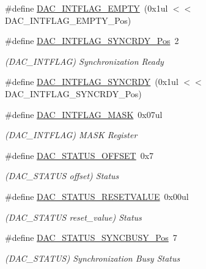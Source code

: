 \begin{DoxyCompactItemize}
\#define \mbox{\hyperlink{group___s_a_m_d21___d_a_c_gaa3cec4c9338963c8d6556c57824b5cbb}{D\+A\+C\+\_\+\+I\+N\+T\+F\+L\+A\+G\+\_\+\+E\+M\+P\+TY}}~(0x1ul $<$$<$ D\+A\+C\+\_\+\+I\+N\+T\+F\+L\+A\+G\+\_\+\+E\+M\+P\+T\+Y\+\_\+\+Pos)
\item 
\#define \mbox{\hyperlink{group___s_a_m_d21___d_a_c_ga850fe6f2c2fefc2f5f6cd72d1757c780}{D\+A\+C\+\_\+\+I\+N\+T\+F\+L\+A\+G\+\_\+\+S\+Y\+N\+C\+R\+D\+Y\+\_\+\+Pos}}~2
\begin{DoxyCompactList}\small\item\em (D\+A\+C\+\_\+\+I\+N\+T\+F\+L\+AG) Synchronization Ready \end{DoxyCompactList}\item 
\#define \mbox{\hyperlink{group___s_a_m_d21___d_a_c_ga7437e469e21f5f1f9c0ba36a3c6b7934}{D\+A\+C\+\_\+\+I\+N\+T\+F\+L\+A\+G\+\_\+\+S\+Y\+N\+C\+R\+DY}}~(0x1ul $<$$<$ D\+A\+C\+\_\+\+I\+N\+T\+F\+L\+A\+G\+\_\+\+S\+Y\+N\+C\+R\+D\+Y\+\_\+\+Pos)
\item 
\#define \mbox{\hyperlink{group___s_a_m_d21___d_a_c_ga7610b49b2915578cf29db233149cf421}{D\+A\+C\+\_\+\+I\+N\+T\+F\+L\+A\+G\+\_\+\+M\+A\+SK}}~0x07ul
\begin{DoxyCompactList}\small\item\em (D\+A\+C\+\_\+\+I\+N\+T\+F\+L\+AG) M\+A\+SK Register \end{DoxyCompactList}\item 
\#define \mbox{\hyperlink{group___s_a_m_d21___d_a_c_ga515f997330d2406b1230c8b83e7c5a6b}{D\+A\+C\+\_\+\+S\+T\+A\+T\+U\+S\+\_\+\+O\+F\+F\+S\+ET}}~0x7
\begin{DoxyCompactList}\small\item\em (D\+A\+C\+\_\+\+S\+T\+A\+T\+US offset) Status \end{DoxyCompactList}\item 
\#define \mbox{\hyperlink{group___s_a_m_d21___d_a_c_ga114959003f1b29d6a60514c7e42781e3}{D\+A\+C\+\_\+\+S\+T\+A\+T\+U\+S\+\_\+\+R\+E\+S\+E\+T\+V\+A\+L\+UE}}~0x00ul
\begin{DoxyCompactList}\small\item\em (D\+A\+C\+\_\+\+S\+T\+A\+T\+US reset\+\_\+value) Status \end{DoxyCompactList}\item 
\#define \mbox{\hyperlink{group___s_a_m_d21___d_a_c_ga78482bceb5799efa5c20ff1781500806}{D\+A\+C\+\_\+\+S\+T\+A\+T\+U\+S\+\_\+\+S\+Y\+N\+C\+B\+U\+S\+Y\+\_\+\+Pos}}~7
\begin{DoxyCompactList}\small\item\em (D\+A\+C\+\_\+\+S\+T\+A\+T\+US) Synchronization Busy Status \end{DoxyCompactList}\item 

\end{DoxyCompactItemize}
